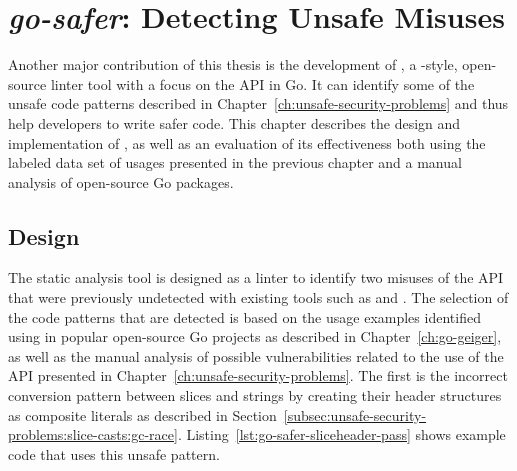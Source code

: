 
\chapter{\textit{go-safer}: Detecting Unsafe Misuses}\label{ch:go-safer}

Another major contribution of this thesis is the development of \toolSafer{}, a \toolVet{}-style, open-source linter
tool with a focus on the \unsafe{} \acrshort{API} in Go.
It can identify some of the unsafe code patterns described in Chapter~\ref{ch:unsafe-security-problems} and thus help
developers to write safer code.
This chapter describes the design and implementation of \toolSafer{}, as well as an evaluation of its effectiveness both
using the labeled data set of \unsafe{} usages presented in the previous chapter and a manual analysis of 
open-source Go packages.





\section{Design}\label{sec:go-safer:design}

The \toolSafer{} static analysis tool is designed as a linter to identify two misuses of the \unsafe{} \acrshort{API}
that were previously undetected with existing tools such as \toolVet{} and \toolGosec{}.
The selection of the code patterns that are detected is based on the \unsafe{} usage examples identified using
\toolGeiger{} in popular open-source Go projects as described in Chapter~\ref{ch:go-geiger}, as well as the manual
analysis of possible vulnerabilities related to the use of the \unsafe{} \acrshort{API} presented in
Chapter~\ref{ch:unsafe-security-problems}.
The first is the incorrect conversion pattern between slices and strings by creating their header structures as
composite literals as described in Section~\ref{subsec:unsafe-security-problems:slice-casts:gc-race}.
Listing~\ref{lst:go-safer-sliceheader-pass} shows example code that uses this unsafe pattern.



